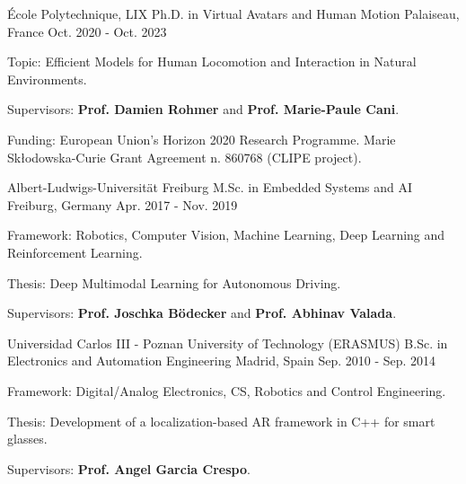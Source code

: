 

\begin{cventries}

  \cventry
    {École Polytechnique, LIX} %
    {Ph.D. in Virtual Avatars and Human Motion} %
    {Palaiseau, France} %
    {Oct. 2020 - Oct. 2023} %
    {
      \begin{cvitems} %
        \item {Topic: Efficient Models for Human Locomotion and Interaction in Natural Environments.}
        \item {Supervisors: \textbf{Prof. Damien Rohmer} and \textbf{Prof. Marie-Paule Cani}.}
        \item {Funding: European Union’s Horizon 2020 Research Programme. Marie Skłodowska-Curie Grant Agreement n. 860768 (CLIPE project).}
      \end{cvitems}
    }

  \cventry
    {Albert-Ludwigs-Universität Freiburg} %
    {M.Sc. in Embedded Systems and AI} %
    {Freiburg, Germany} %
    {Apr. 2017 - Nov. 2019} %
    {
      \begin{cvitems} %
        \item {Framework: Robotics, Computer Vision, Machine Learning, Deep Learning and Reinforcement Learning.}
        \item {Thesis: Deep Multimodal Learning for Autonomous Driving.}
        \item {Supervisors: \textbf{Prof. Joschka Bödecker} and \textbf{Prof. Abhinav Valada}.}
      \end{cvitems}
    }

  \cventry
    {Universidad Carlos III - Poznan University of Technology (ERASMUS)} %
    {B.Sc. in Electronics and Automation Engineering} %
    {Madrid, Spain} %
    {Sep. 2010 - Sep. 2014} %
    {
      \begin{cvitems} %
        \item {Framework: Digital/Analog Electronics, CS, Robotics and Control Engineering.}
        \item {Thesis: Development of a localization-based AR framework in C++ for smart glasses.}
        \item {Supervisors: \textbf{Prof. Angel Garcia Crespo}.}
      \end{cvitems}
    }

\end{cventries}
